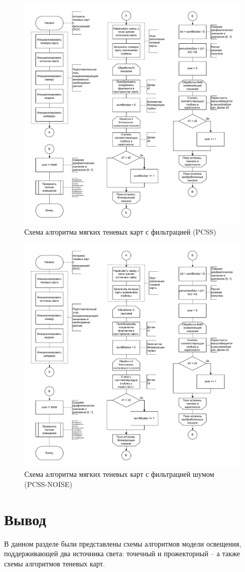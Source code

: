 \begin{figure}[h]
    \centering
    \includegraphics[width=\textwidth]{charts/shadow_map_pcss.pdf}
    \caption{Схема алгоритма мягких теневых карт с фильтрацией (PCSS)}
    \label{chart:shadow_map_pcss}
\end{figure}
\FloatBarrier
\begin{figure}[h]
    \centering
    \includegraphics[width=\textwidth]{charts/shadow_map_pcss_noise.pdf}
    \caption{Схема алгоритма мягких теневых карт с фильтрацией шумом (PCSS-NOISE)}
    \label{chart:shadow_map_pcss_noise}
\end{figure}
\FloatBarrier

\section*{Вывод}

В данном разделе были представлены схемы алгоритмов модели освещения,
поддерживающей два источника света: точечный и прожекторный -- а также
схемы алгоритмов теневых карт.